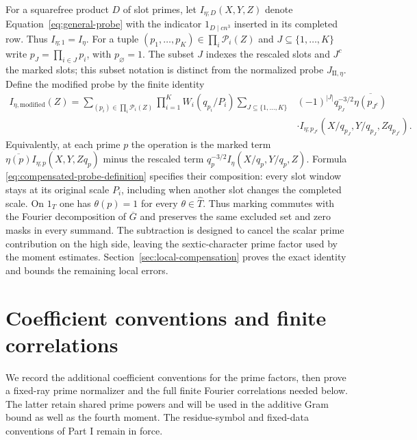 \documentclass[11pt,a4paper]{article}
\numberwithin{equation}{section}
\numberwithin{figure}{section}
\theoremstyle{definition}
\theoremstyle{remark}
\begin{document}
For a squarefree product $D$ of slot primes, let
$I_{\eta;D}(X,Y,Z)$ denote Equation~\eqref{eq:general-probe} with
the indicator $1_{D\mid cn^3}$ inserted in its completed row.
Thus $I_{\eta;1}=I_\eta$.  For a tuple
$(p_1,\ldots,p_K)\in\prod_i\mathcal P_i(Z)$ and
$J\subseteq\{1,\ldots,K\}$ write $p_J=\prod_{i\in J}p_i$, with
$p_\varnothing=1$.  The subset $J$ indexes the rescaled slots and $J^c$
the marked slots; this subset notation is distinct from the normalized
probe $J_{\mathrm{II},\eta}$.  Define the modified probe by the finite identity
\begin{equation}\label{eq:compensated-probe-definition}
\begin{split}
 I_{\eta,\mathrm{modified}}(Z)
 =\sum_{(p_i)\in\prod_i\mathcal P_i(Z)}\prod_{i=1}^K W_i(q_{p_i}/P_i)
 \sum_{J\subseteq\{1,\ldots,K\}}&(-1)^{|J|}q_{p_J}^{-3/2}
          \overline{\eta(p_{J^c})}\\
 &\cdot I_{\eta;p_{J^c}}
       (X/q_{p_J},Y/q_{p_J},Zq_{p_{J^c}}).
\end{split}
\end{equation}
Equivalently, at each prime $p$ the operation is the marked term
$\overline{\eta(p)}I_{\eta;p}(X,Y,Zq_p)$ minus the rescaled term
$q_p^{-3/2}I_\eta(X/q_p,Y/q_p,Z)$.  Formula
\eqref{eq:compensated-probe-definition} specifies their composition:
every slot window stays at its original scale $P_i$, including when
another slot changes the completed scale.  On $1_T$ one has
$\theta(p)=1$ for every $\theta\in\widehat T$.  Thus marking commutes
with the Fourier decomposition of $\overline G$ and preserves the
same excluded set and zero masks in every summand.
The subtraction is designed to cancel the scalar prime contribution on
the high side, leaving the sextic-character prime factor used by the moment
estimates. Section~\ref{sec:local-compensation} proves the exact identity
and bounds the remaining local errors.

\section{Coefficient conventions and finite correlations}
\label{sec:additional-arithmetic}

We record the additional coefficient conventions for the prime factors,
then prove a fixed-ray prime normalizer and the full finite Fourier
correlations needed below. The latter retain shared prime powers and will
be used in the additive Gram bound as well as the fourth moment. The
residue-symbol and fixed-data conventions of Part I remain in force.
\end{document}
